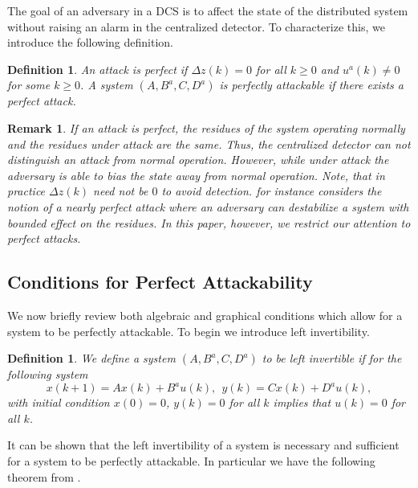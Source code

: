 \documentclass[letterpaper, 10 pt, conference]{ieeeconf}
\newtheorem{remark}[theorem]{Remark}
\newtheorem{definition}[theorem]{Definition}
\begin{document}
The goal of an adversary in a DCS is to affect the state of the distributed system without raising an alarm in the centralized detector. To characterize this, we introduce the following definition.

\begin{definition} 
An attack is perfect if $\Delta z(k) = 0$ for all $k \ge 0$ and $u^a(k) \neq 0$ for some $k \ge 0$. A system $(A,B^a,C,D^a)$ is perfectly attackable if there exists a perfect attack.
\end{definition}
\begin{remark}
If an attack is perfect, the residues of the system operating normally and the residues under attack are the same. Thus, the centralized detector can not distinguish an attack from normal operation. However, while under attack the adversary is able to bias the state away from normal operation. Note, that in practice $\Delta z(k)$ need not be $0$ to avoid detection. \cite{Cam2014} for instance considers the notion of a nearly perfect attack where an adversary can destabilize a system with bounded effect on the residues. In this paper, however, we restrict our attention to perfect attacks.
\end{remark}
\subsection{Conditions for Perfect Attackability}
We now briefly review both algebraic and graphical conditions which allow for a system to be perfectly attackable. To begin we introduce left invertibility.
\begin{definition}
We define a system $(A,B^a,C,D^a)$ to be left invertible if for the following system
\begin{equation}
x(k+1) = Ax(k) + B^au(k), ~~y(k) = Cx(k) + D^au(k),
\end{equation}
with initial condition $x(0) = 0$, $y(k) = 0$ for all $k$ implies that $u(k) = 0$ for all $k$.
\end{definition}
 It can be shown that the left invertibility of a system is necessary and sufficient for a system to be perfectly attackable. In particular we have the following theorem from \cite{Cam2014}.
\end{document}
